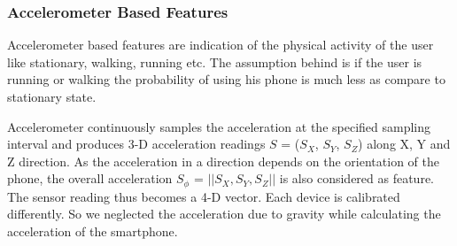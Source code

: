 \subsubsection{Accelerometer Based Features}
Accelerometer based features are indication of the physical
activity of the user like stationary, walking, running etc. The assumption behind is if the
user is running or walking the probability of using his phone is much less as compare to
stationary state.

Accelerometer continuously samples the acceleration at the specified sampling interval and produces 3-D acceleration readings $S$ = ($S_X$, $S_Y$, $S_Z$) along X, Y and Z direction. As the acceleration in a direction depends on the orientation of the phone, the overall acceleration $S_\phi$ = $||S_X, S_Y, S_Z||$ is also considered as feature. The sensor reading thus becomes a 4-D vector.
Each device is calibrated differently. So we neglected the acceleration due to gravity while calculating the acceleration of the smartphone.

